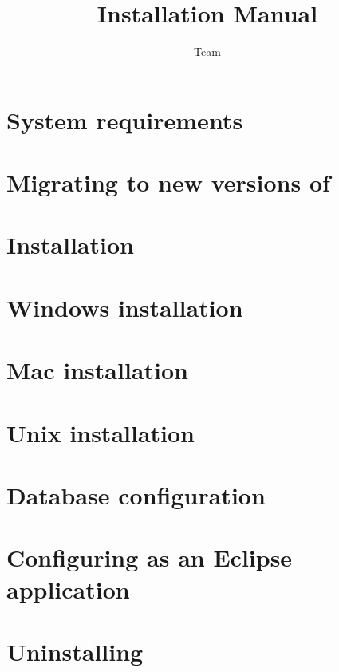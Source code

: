 
%
\title{\app{} Installation Manual}
\author*{\app{} Team}{}
\maketitle


\tableofcontents
\renewcommand{\bxcomment}[2]{}%
\clearpage
\setcounter{secnumdepth}{2}%

\chapter{System requirements}

\clearpage
\chapter{Migrating to new versions of \app{}}

\clearpage
\chapter{Installation}

\clearpage
\chapter{Windows installation}

\clearpage
\chapter{Mac installation}

\clearpage
\chapter{Unix installation}
\label{Unix}

\clearpage
\chapter{Database configuration}


\chapter{Configuring \app{} as an Eclipse application}

\clearpage
\chapter{Uninstalling \app{}}

